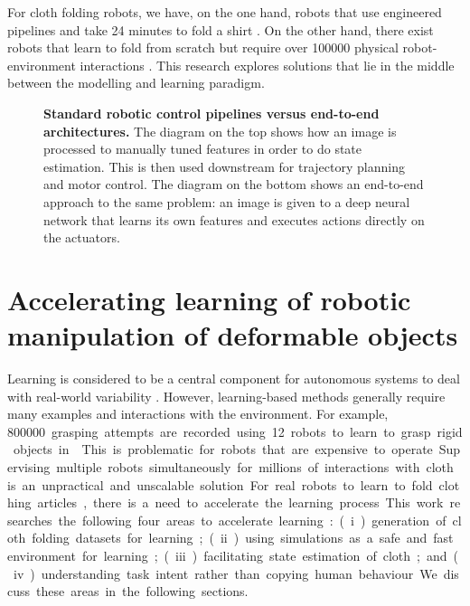 \documentclass[\home/main.tex]{subfiles}
\begin{document}
For cloth folding robots, we have, on the one hand, robots that use engineered pipelines and take 24 minutes to fold a shirt \autocite{Maitin2010}. On the other hand, there exist robots that learn to fold from scratch but require over \qty{100000}{} physical robot-environment interactions \autocite{Matas2018}. This research explores solutions that lie in the middle between the modelling and learning paradigm.



\begin{sidewaysfigure}
    
    \caption{\textbf{Standard robotic control pipelines versus end-to-end architectures.} The diagram on the top shows how an image is processed to manually tuned features in order to do state estimation. This is then used downstream for trajectory planning and motor control. The diagram on the bottom shows an end-to-end approach to the same problem: an image is given to a deep neural network that learns its own features and executes actions directly on the actuators.}
    \label{fig:intro_end2end}
\end{sidewaysfigure}

\section{Accelerating learning of robotic manipulation of deformable objects}
Learning is considered to be a central component for autonomous systems to deal with real-world variability \autocite{kroemer2021review}. However, learning-based methods generally require many examples and interactions with the environment. For example, \qty{800000} grasping attempts are recorded using \qty{12} robots to learn to grasp rigid objects in \autocite{Levine2018}. This is problematic for robots that are expensive to operate. Supervising multiple robots simultaneously for millions of interactions with cloth is an unpractical and unscalable solution. For real robots to learn to fold clothing articles, there is a need to accelerate the learning process. This work researches the following four areas to accelerate learning:
(i) generation of cloth folding datasets for learning;
(ii) using simulations as a safe and fast environment for learning;
(iii) facilitating state estimation of cloth; and
(iv) understanding task intent rather than copying human behaviour.
We discuss these areas in the following sections.
\end{document}
